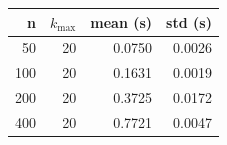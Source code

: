 \begin{tabular}{rrrr}\toprule
n & $k_{\max}$ & mean (s) & std (s)\\\midrule
50 & 20 & 0.0750 & 0.0026\\
100 & 20 & 0.1631 & 0.0019\\
200 & 20 & 0.3725 & 0.0172\\
400 & 20 & 0.7721 & 0.0047\\
\bottomrule\end{tabular}

